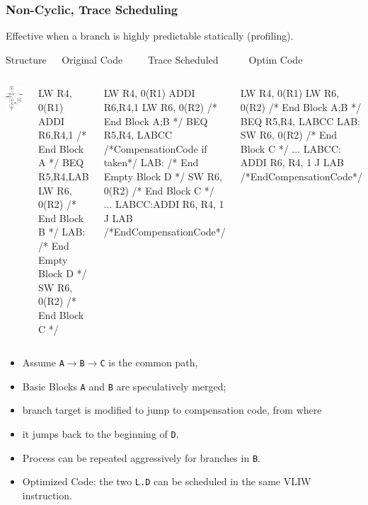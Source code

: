 \documentclass{beamer}
\renewcommand{\emph}[1]{\textcolor{structure}{#1}}
\newcommand{\emp}[1]{\textcolor{DikuRed}{ #1}}
\begin{document}
\begin{frame}[fragile,t]
    \frametitle{Non-Cyclic, Trace Scheduling}

Effective when a branch is highly predictable statically (profiling).

\begin{block}{Structure{\tt~~~}Original Code{\tt~~~~~}Trace Scheduled{\tt~~~~~~}Optim Code}\vspace{-1ex}
\begin{columns}
\includegraphics[width=13ex]{Figures/TraceSchedCFG}
\begin{colorcode}[fontsize=\tiny]
      LW   R4, 0(R1)
      ADDI R6,R4,1
/* End Block A */
      BEQ  R5,R4,LAB
      LW   R6, 0(R2)
/* End Block B */
LAB:
/* End Empty Block D */
      SW   R6, 0(R2) 
/* End Block C */
\end{colorcode}
\begin{colorcode}[fontsize=\tiny]
      LW   R4, 0(R1)
      ADDI R6,R4,1
      \emph{LW   R6, 0(R2)}
/* End Block A;B */
      BEQ  R5,R4,\emp{LABCC}
/*CompensationCode if taken*/
LAB:  
/* End Empty Block D */
      SW   R6, 0(R2) 
/* End Block C */
...
\emp{LABCC:}ADDI R6, R4, 1
      J    LAB
/*EndCompensationCode*/
\end{colorcode}
\begin{colorcode}[fontsize=\tiny]
      \emph{LW   R4, 0(R1)}
      \emph{LW   R6, 0(R2)}
/* End Block A;B */
      BEQ  R5,R4,\emp{LABCC}
LAB:  SW   R6, 0(R2) 
/* End Block C */
...
\emp{LABCC:}  ADDI R6, R4, 1
        J    LAB
/*EndCompensationCode*/
\end{colorcode}
\end{columns}
\end{block}

\bigskip

\begin{scriptsize}
\begin{itemize}
    \item Assume {\tt A$\rightarrow$B$\rightarrow$C} is the common path,
    \item Basic Blocks {\tt A} and {\tt B} are speculatively merged; 
    \item branch target is modified to jump to compensation code, from where
    \item it jumps back to the beginning of {\tt D}.
    \item Process can be repeated aggressively for branches in {\tt B}.
    \item Optimized Code: the two \emph{{\tt L.D}} can be scheduled in the same VLIW instruction.
\end  {itemize}
\end{scriptsize}
\end{frame}
\end{document}
